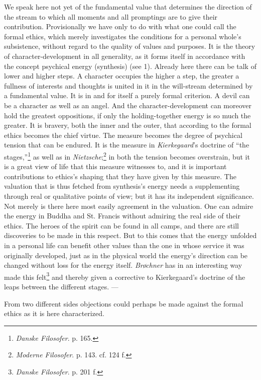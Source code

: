 \documentclass[12pt,a4paper]{book}
\newcommand{\opage}[1]{\marginnote{\footnotesize\textit{[#1]}}}
\begin{document}
We speak here not yet of the fundamental value that determines the direction of the stream to which all
moments and all promptings are to give their contribution. Provisionally we have only to do with what one
could call the formal ethics, which merely investigates the conditions for a personal whole's
subsistence, without regard to the quality of values and purposes. It is the theory of character-development
in all generality, as it forms itself in accordance with the concept psychical energy (synthesis) (see 1).
Already here there can be talk of lower and higher steps. A character occupies the higher a step, the
greater a fullness of interests and thoughts is united in it in the will-stream determined by a \opage{353}fundamental
value. It is in and for itself a purely formal criterion. A devil can be a character as well as an angel.
And the character-development can moreover hold the greatest oppositions, if only the holding-together energy
is so much the greater. It is bravery, both the inner and the outer, that according to the formal ethics
becomes the chief virtue. The measure becomes the degree of psychical tension that can be endured. It is the
measure in \emph{Kierkegaard}'s doctrine of ``the stages,''\footnote{\emph{Danske Filosofer}. p. 165.} as
well as in \emph{Nietzsche};\footnote{\emph{Moderne Filosofer}. p. 143. cf. 124 f.} in both the tension
becomes overstrain, but it is a great view of life that this measure witnesses to, and it is important
contributions to ethics's shaping that they have given by this measure. The valuation that is thus fetched
from synthesis's energy needs a supplementing through real or qualitative points of view; but it has its
independent significance. Not merely is there here most easily agreement in the valuation. One can admire
the energy in Buddha and St. Francis without admiring the real side of their ethics. The heroes of the
spirit can be found in all camps, and there are still discoveries to be made in this respect. But to this
comes that the energy unfolded in a personal life can benefit other values than the one in whose service it
was originally developed, just as in the physical world the energy's direction can be changed without loss
for the energy itself. \emph{Brøchner} has in an interesting way made this felt\footnote{\emph{Danske
Filosofer}. p. 201 f.} and thereby given a corrective to Kierkegaard's doctrine of the leaps between the
different stages. ---

From two different sides objections could perhaps be made against the formal ethics as it is here
characterized.
\end{document}
